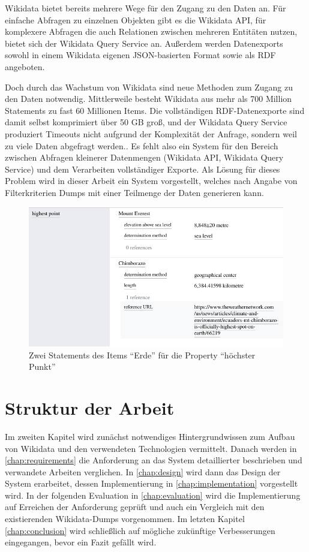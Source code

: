 Wikidata bietet bereits mehrere Wege für den Zugang zu den Daten an.
Für einfache Abfragen zu einzelnen Objekten gibt es die Wikidata API, für komplexere Abfragen die auch Relationen zwischen mehreren Entitäten nutzen, bietet sich der Wikidata Query Service an. 
Außerdem werden Datenexports sowohl in einem Wikidata eigenen JSON-basierten Format sowie als RDF angeboten.

Doch durch das Wachstum von Wikidata sind neue Methoden zum Zugang zu den Daten notwendig.
Mittlerweile besteht Wikidata aus mehr als 700 Million Statements zu fast 60 Millionen Items.
Die vollständigen RDF-Datenexporte sind damit selbst komprimiert über 50 GB groß, und der Wikidata Query Service produziert Timeouts nicht aufgrund der Komplexität der Anfrage, sondern weil zu viele Daten abgefragt werden.\cite{wd-wk-common-references}.
Es fehlt also ein System für den Bereich zwischen Abfragen kleinerer Datenmengen (Wikidata API, Wikidata Query Service) und dem Verarbeiten vollständiger Exporte.
Als Lösung für dieses Problem wird in dieser Arbeit ein System vorgestellt, welches nach Angabe von Filterkriterien Dumps mit einer Teilmenge der Daten generieren kann. 

\begin{figure}
  \includegraphics[width=\linewidth]{pics/example-statement}
  \caption{Zwei Statements des Items ``Erde'' für die Property ``höchster Punkt''}
  \label{fig:sample-statement}
\end{figure} 

\section{Struktur der Arbeit}
Im zweiten Kapitel wird zunächst notwendiges Hintergrundwissen zum Aufbau von Wikidata und den verwendeten Technologien vermittelt.
Danach werden in \cref{chap:requirements} die Anforderung an das System detaillierter beschrieben und verwandete Arbeiten verglichen.
In \cref{chap:design} wird dann das Design der System erarbeitet, dessen Implementierung in \cref{chap:implementation} vorgestellt wird.
In der folgenden Evaluation in \cref{chap:evaluation} wird die Implementierung auf Erreichen der Anforderung geprüft und auch ein Vergleich mit den existierenden Wikidata-Dumps vorgenommen.
Im letzten Kapitel \cref{chap:conclusion} wird schließlich auf mögliche zukünftige Verbesserungen eingegangen, bevor ein Fazit gefällt wird.

